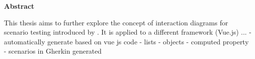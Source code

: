 \thispagestyle{empty}
\begin{center}
    
    \vspace{0.9cm}
    \large{}
    \textbf{Abstract}

\end{center}
\begin{center}
\vspace{0.3cm}
\large{}
\vspace{0.4cm}


This thesis aims to further explore the concept of interaction diagrams for scenario testing introduced  by \cite{zhang2019scenario}. It is applied to a different framework (Vue.js) ...
- automatically generate based on vue js code
- lists
- objects
- computed property
- scenarios in Gherkin generated


\end{center}